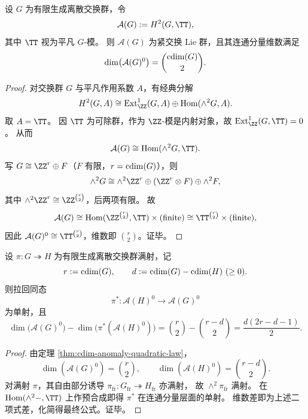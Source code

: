 \begin{theorem}[二阶相位异常的圆维二次律]\label{thm:cdim-anomaly-quadratic-law}
设 \(G\) 为有限生成离散交换群，令
\[
\mathcal A(G):=H^2(G,\TT),
\]
其中 \(\TT\) 视为平凡 \(G\)-模。
则 \(\mathcal A(G)\) 为紧交换 Lie 群，且其连通分量维数满足
\[
\dim\bigl(\mathcal A(G)^0\bigr)=\binom{\operatorname{cdim}(G)}{2}.
\]
\end{theorem}
\begin{proof}
对交换群 \(G\) 与平凡作用系数 \(A\)，有经典分解
\[
H^2(G,A)\cong \operatorname{Ext}_{\ZZ}^1(G,A)\oplus \operatorname{Hom}(\wedge^2 G,A).
\]
取 \(A=\TT\)。
因 \(\TT\) 为可除群，作为 \(\ZZ\)-模是内射对象，故
\(
\operatorname{Ext}_{\ZZ}^1(G,\TT)=0
\)。
从而
\[
\mathcal A(G)\cong \operatorname{Hom}(\wedge^2 G,\TT).
\]
写 \(G\cong \ZZ^r\oplus F\)（\(F\) 有限，\(r=\operatorname{cdim}(G)\)），则
\[
\wedge^2 G\cong \wedge^2\ZZ^r\oplus(\ZZ^r\otimes F)\oplus \wedge^2 F,
\]
其中 \(\wedge^2\ZZ^r\cong \ZZ^{\binom r2}\)，后两项有限。
故
\[
\mathcal A(G)\cong
\operatorname{Hom}(\ZZ^{\binom r2},\TT)\times(\text{finite})
\cong
\TT^{\binom r2}\times(\text{finite}),
\]
因此 \(\mathcal A(G)^0\cong \TT^{\binom r2}\)，维数即 \(\binom r2\)。证毕。
\end{proof}

\begin{corollary}[压缩圆维下的异常相位二次开销]\label{cor:cdim-anomaly-compression-overhead}
设 \(\pi:G\twoheadrightarrow H\) 为有限生成离散交换群满射，记
\[
r:=\operatorname{cdim}(G),\qquad d:=\operatorname{cdim}(G)-\operatorname{cdim}(H)\ (\ge 0).
\]
则拉回同态
\[
\pi^\ast:\mathcal A(H)^0\longrightarrow \mathcal A(G)^0
\]
为单射，且
\[
\dim\bigl(\mathcal A(G)^0\bigr)-\dim\bigl(\pi^\ast(\mathcal A(H)^0)\bigr)
=\binom r2-\binom{r-d}{2}
=\frac{d(2r-d-1)}{2}.
\]
\end{corollary}
\begin{proof}
由定理 \ref{thm:cdim-anomaly-quadratic-law}，
\[
\dim(\mathcal A(G)^0)=\binom r2,\qquad
\dim(\mathcal A(H)^0)=\binom{r-d}{2}.
\]
对满射 \(\pi\)，其自由部分诱导 \(\pi_{\mathrm{fr}}:G_{\mathrm{fr}}\twoheadrightarrow H_{\mathrm{fr}}\) 亦满射，
故 \(\wedge^2\pi_{\mathrm{fr}}\) 满射。
在 \(\operatorname{Hom}(\wedge^2-,\TT)\) 上作预合成即得 \(\pi^\ast\) 在连通分量层面的单射。
维数差即为上述二项式差，化简得最终公式。证毕。
\end{proof}

